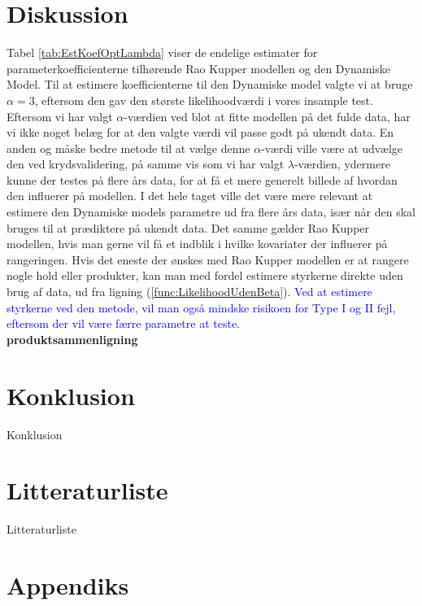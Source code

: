 \documentclass[11pt,a4paper]{article}
\begin{document}
\clearpage
\section{Diskussion}
Tabel \ref{tab:EstKoefOptLambda} viser de endelige estimater for parameterkoefficienterne tilhørende Rao Kupper modellen og den Dynamiske Model. Til at estimere koefficienterne til den Dynamiske model valgte vi at bruge $\alpha=3$, eftersom den gav den største likelihoodværdi i vores insample test. Eftersom vi har valgt $\alpha$-værdien ved blot at fitte modellen på det fulde data, har vi ikke noget belæg for at den valgte værdi vil passe godt på ukendt data. En anden og måske bedre metode til at vælge denne $\alpha$-værdi ville være at udvælge den ved krydsvalidering, på samme vis som vi har valgt $\lambda$-værdien, ydermere kunne der testes på flere års data, for at få et mere generelt billede af hvordan den influerer på modellen. I det hele taget ville det være mere relevant at estimere den Dynamiske models parametre ud fra flere års data, især når den skal bruges til at prædiktere på ukendt data. Det samme gælder Rao Kupper modellen, hvis man gerne vil få et indblik i hvilke kovariater der influerer på rangeringen. Hvis det eneste der ønskes med Rao Kupper modellen er at rangere nogle hold eller produkter, kan man med fordel estimere styrkerne direkte uden brug af data, ud fra ligning (\ref{func:LikelihoodUdenBeta}). \textcolor{blue}{Ved at estimere styrkerne ved den metode, vil man også mindske risikoen for Type I og II fejl, eftersom der vil være færre parametre at teste.} \\


\textbf{produktsammenligning}
\section{Konklusion}
Konklusion
\clearpage
\section{Litteraturliste}
Litteraturliste
\clearpage
\section{Appendiks}

\printbibliography %
\end{document}
